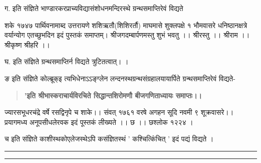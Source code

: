 \documentclass[11pt, openany]{book}
\begin{document}
\begin{sloppypar}
\hangindent=0.2in \hspace{0.2in}ग. इति संज्ञिते भाण्डारकरप्राच्यविद्यासंशोधनमन्दिरस्थे ग्रन्थसमाप्तिरेवं विद्यते\textendash

 \hspace{0.2in}शके १७४७ पार्थिवनामाब्द उत्तरायणे शशिऋतौ(शिशिरर्तौ) माघमासे शुक्लपक्षे १ भौमवासरे धनिष्ठानक्षत्रे वर्यान्योग एतच्छुभदिन इदं पुस्तकं समाप्तम्। श्रीजगदम्बार्पणमस्तु शुभं भवतु ।। श्रीरस्तु ।। श्रीराम ।। श्रीकृष्ण श्रीहरि ।। 

 \hspace{0.2in}घ. इति संज्ञिते ग्रन्थसमाप्तिर्न विद्यते त्रुटितत्वात्। । 

 \hspace{0.2in}ङ इति संज्ञिते कोल्ब्रूक्इ त्यभिधेनाऽऽङ्ग्लेन लन्दनस्थग्रन्थसंग्रहालयायार्पिते ग्रन्थसमाप्तिरेवं विद्यते- 

\begin{quote}
\hspace{0.2in}\textbf{'इति श्रीभास्कराचार्यविरचिते सिद्धान्तशिरोमणौ बीजगणिताध्यायः समाप्तः।।}
\end{quote}

 \hspace{0.2in}ज्यारसभूधरचंद्रे वर्षे रसद्विनृपे च शाके।। संवत् १७६१ वरषे अगहन सूदि नवमी ९ शूक्रवासरे।। प्रयागमध्य अनूपसीधलेरवक इदं पूस्तकं लीख्यते ।। छ ।। छश्लोक १२२४ । 

 \hspace{0.2in}च इति संज्ञिते काशीस्थकोएलेजस्थेऽपि कसंज्ञितस्थं ' कश्चित्किंचित् ' इदं पद्यं विद्यते । 

\vspace{5mm}
\begin{center}
\rule{0.3\linewidth}{0.5pt}

\vspace{-5mm}

\rule{0.3\linewidth}{0.5pt}
\end{center}
\thispagestyle{empty}
\end{sloppypar}
\end{document}
